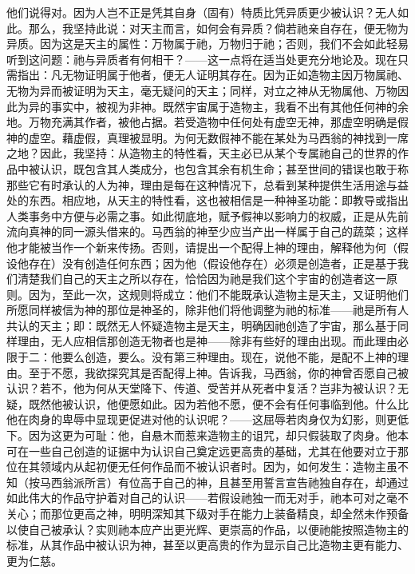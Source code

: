 他们说得对。因为人岂不正是凭其自身（固有）特质比凭异质更少被认识？无人如此。那么，我坚持此说：对天主而言，如何会有异质？倘若祂亲自存在，便无物为异质。因为这是天主的属性：万物属于祂，万物归于祂；否则，我们不会如此轻易听到这问题：祂与异质者有何相干？——这一点将在适当处更充分地论及。现在只需指出：凡无物证明属于他者，便无人证明其存在。因为正如造物主因万物属祂、无物为异而被证明为天主，毫无疑问的天主；同样，对立之神从无物属他、万物因此为异的事实中，被视为非神。既然宇宙属于造物主，我看不出有其他任何神的余地。万物充满其作者，被他占据。若受造物中任何处有虚空无神，那虚空明确是假神的虚空。藉虚假，真理被显明。为何无数假神不能在某处为马西翁的神找到一席之地？因此，我坚持：从造物主的特性看，天主必已从某个专属祂自己的世界的作品中被认识，既包含其人类成分，也包含其余有机生命；甚至世间的错误也敢于称那些它有时承认的人为神，理由是每在这种情况下，总看到某种提供生活用途与益处的东西。相应地，从天主的特性看，这也被相信是一种神圣功能：即教导或指出人类事务中方便与必需之事。如此彻底地，赋予假神以影响力的权威，正是从先前流向真神的同一源头借来的。马西翁的神至少应当产出一样属于自己的蔬菜；这样他才能被当作一个新来传扬。否则，请提出一个配得上神的理由，解释他为何（假设他存在）没有创造任何东西；因为他（假设他存在）必须是创造者，正是基于我们清楚我们自己的天主之所以存在，恰恰因为祂是我们这个宇宙的创造者这一原则。因为，至此一次，这规则将成立：他们不能既承认造物主是天主，又证明他们所愿同样被信为神的那位是神圣的，除非他们将他调整为祂的标准——祂是所有人共认的天主；即：既然无人怀疑造物主是天主，明确因祂创造了宇宙，那么基于同样理由，无人应相信那创造无物者也是神——除非有些好的理由出现。而此理由必限于二：他要么创造，要么。没有第三种理由。现在，说他不能，是配不上神的理由。至于不愿，我欲探究其是否配得上神。告诉我，马西翁，你的神曾否愿自己被认识？若不，他为何从天堂降下、传道、受苦并从死者中复活？岂非为被认识？无疑，既然他被认识，他便愿如此。因为若他不愿，便不会有任何事临到他。什么比他在肉身的卑辱中显现更促进对他的认识呢？——这屈辱若肉身仅为幻影，则更低下。因为这更为可耻：他，自悬木而惹来造物主的诅咒，却只假装取了肉身。他本可在一些自己创造的证据中为认识自己奠定远更高贵的基础，尤其在他要对立于那位在其领域内从起初便无任何作品而不被认识者时。因为，如何发生：造物主虽不知（按马西翁派所言）有位高于自己的神，且甚至用誓言宣告祂独自存在，却通过如此伟大的作品守护着对自己的认识——若假设祂独一而无对手，祂本可对之毫不关心；而那位更高之神，明明深知其下级对手在能力上装备精良，却全然未作预备以使自己被承认？实则祂本应产出更光辉、更崇高的作品，以便祂能按照造物主的标准，从其作品中被认识为神，甚至以更高贵的作为显示自己比造物主更有能力、更为仁慈。\par

